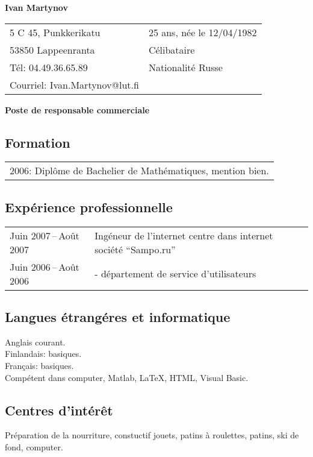 \documentclass[11pt]{article}
\begin{document}
\begin{flushleft}
	\Large{\bf Ivan Martynov}
\end{flushleft}

\begin{tabular}{p{}p{}}
	5 C 45, Punkkerikatu&25 ans, n\'ee le 12/04/1982\\
	53850 Lappeenranta&C\'elibataire\\
	T\'el: 04.49.36.65.89&Nationalit\'e Russe\\
	Courriel: Ivan.Martynov@lut.fi
\end{tabular}

\bigskip

\begin{center}
	\textbf{Poste de responsable commerciale}
\end{center}

\subsection*{Formation}

\begin{tabular}{l}
	2006: Dipl\^ome de Bachelier de Math\'ematiques, mention bien.
\end{tabular}

\subsection*{Exp\'erience professionnelle}

\begin{tabular}{l l}
	Juin 2007\,--\,Ao\^ut 2007&Ing\'eneur de l'internet centre dans internet soci\'et\'e ``Sampo.ru''\\
	Juin 2006\,--\,Ao\^ut 2006&- d\'epartement de service d'utilisateurs
\end{tabular}

\subsection*{Langues \'etrang\'eres et informatique}

Anglais courant.\\
Finlandais: basiques.\\
Fran\c{c}ais: basiques.\\
Comp\'etent dans computer, Matlab, \LaTeX, HTML, Visual Basic.

\subsection*{Centres d'int\'er\^et}

Pr\'eparation de la nourriture, constuctif jouets, patins \`a roulettes, patins, ski de fond, computer.
\end{document}
